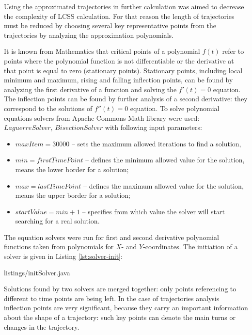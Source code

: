 Using the approximated trajectories in further calculation was aimed to decrease the complexity of LCSS calculation. For that reason the length of trajectories must be reduced by choosing several key representative points from the trajectories by analyzing the approximation polynomials.

It is known from Mathematics that critical points of a polynomial $f(t)$ refer to points where the polynomial function is not differentiable or the derivative at that point is equal to zero (stationary points). Stationary points, including local minimum and maximum, rising and falling inflection points, can be found by analyzing the first derivative of a function and solving the $f'(t) = 0$ equation. The inflection points can be found by further analysis of a second derivative: they correspond to the solutions of $f''(t) = 0$ equation. To solve polynomial equations solvers from Apache Commons Math library were used: $LaguerreSolver$, $BisectionSolver$ with following input parameters:

\begin{itemize}
	\setlength\itemsep{0em}
	\item $maxItem = 30000$ -- sets the maximum allowed iterations to find a solution,
	\item $min = firstTimePoint$ -- defines the minimum allowed value for the solution, means the lower border for a solution;
	\item $max = lastTimePoint$ -- defines the maximum allowed value for the solution, means the upper border for a solution;
	\item $startValue = min + 1$ -- specifies from which value the solver will start searching for a real solution.
\end{itemize}

The equation solvers were run for first and second derivative polynomial functions taken from polynomials for $X$- and $Y$-coordinates. The initiation of a solver is given in Listing \ref{lst:solver-init}:

 {listings/initSolver.java}

Solutions found by two solvers are merged together: only points referencing to different to time points are being left. In the case of trajectories analysis inflection points are very significant, because they carry an important information about the shape of a trajectory: such key points can denote the main turns or changes in the trajectory.

